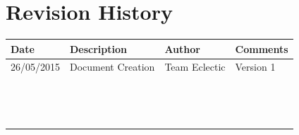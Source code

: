 \documentclass[11pt]{article}
\begin{document}


\setcounter{tocdepth}{3}
\tableofcontents

\newpage
\section{Revision History}
\begin{table}[h]
\begin{tabular}{llll}
\textbf{Date}          & \textbf{Description}  & \textbf{Author}       & \textbf{Comments}   \\ \hline
\multicolumn{1}{|R{2cm}|}{26/05/2015} & \multicolumn{1}{L{4.5cm}|}{Document Creation} & \multicolumn{1}{l|}{Team Eclectic} & \multicolumn{1}{L{4cm}|}{Version 1} \\ \hline
\multicolumn{1}{|l|}{} & \multicolumn{1}{l|}{} & \multicolumn{1}{l|}{} & \multicolumn{1}{l|}{} \\ \hline
\multicolumn{1}{|l|}{} & \multicolumn{1}{l|}{} & \multicolumn{1}{l|}{} & \multicolumn{1}{l|}{} \\ \hline
\multicolumn{1}{|l|}{} & \multicolumn{1}{l|}{} & \multicolumn{1}{l|}{} & \multicolumn{1}{l|}{} \\ \hline
\multicolumn{1}{|l|}{} & \multicolumn{1}{l|}{} & \multicolumn{1}{l|}{} & \multicolumn{1}{l|}{} \\ \hline
\multicolumn{1}{|l|}{} & \multicolumn{1}{l|}{} & \multicolumn{1}{l|}{} & \multicolumn{1}{l|}{} \\ \hline
\multicolumn{1}{|l|}{} & \multicolumn{1}{l|}{} & \multicolumn{1}{l|}{} & \multicolumn{1}{l|}{} \\ \hline
\multicolumn{1}{|l|}{} & \multicolumn{1}{l|}{} & \multicolumn{1}{l|}{} & \multicolumn{1}{l|}{} \\ \hline
\multicolumn{1}{|l|}{} & \multicolumn{1}{l|}{} & \multicolumn{1}{l|}{} & \multicolumn{1}{l|}{} \\ \hline
\multicolumn{1}{|l|}{} & \multicolumn{1}{l|}{} & \multicolumn{1}{l|}{} & \multicolumn{1}{l|}{} \\ \hline
\multicolumn{1}{|l|}{} & \multicolumn{1}{l|}{} & \multicolumn{1}{l|}{} & \multicolumn{1}{l|}{} \\ \hline
\multicolumn{1}{|l|}{} & \multicolumn{1}{l|}{} & \multicolumn{1}{l|}{} & \multicolumn{1}{l|}{} \\ \hline
\multicolumn{1}{|l|}{} & \multicolumn{1}{l|}{} & \multicolumn{1}{l|}{} & \multicolumn{1}{l|}{} \\ \hline
\multicolumn{1}{|l|}{} & \multicolumn{1}{l|}{} & \multicolumn{1}{l|}{} & \multicolumn{1}{l|}{} \\ \hline
\multicolumn{1}{|l|}{} & \multicolumn{1}{l|}{} & \multicolumn{1}{l|}{} & \multicolumn{1}{l|}{} \\ \hline
\end{tabular}
\end{table}
\end{document}
